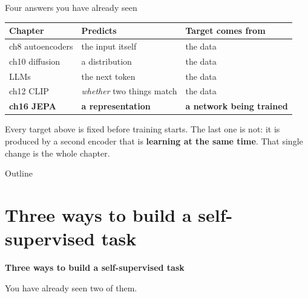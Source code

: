 \documentclass[aspectratio=169]{beamer}
\begin{document}
\begin{frame}{Four answers you have already seen}
  \small
  \begin{tabular}{@{}p{3.6cm}p{4.2cm}p{4.6cm}@{}}
    \textbf{Chapter} & \textbf{Predicts} & \textbf{Target comes from} \\[3pt]
    \hline\rule{0pt}{3ex}
    ch8 autoencoders   & the input itself      & the data \\[4pt]
    ch10 diffusion     & a distribution        & the data \\[4pt]
    LLMs               & the next token        & the data \\[4pt]
    ch12 CLIP          & \emph{whether} two things match & the data \\[6pt]
    \hline\rule{0pt}{3ex}
    \textbf{ch16 JEPA} & \textbf{a representation} & \textbf{a network being trained} \\
  \end{tabular}
  \vskip 10pt
  Every target above is fixed before training starts. The last one is not: it is produced
  by a second encoder that is \textbf{learning at the same time}.
  \vskip 6pt
  \footnotesize\color{armred}That single change is the whole chapter.
\end{frame}

\begin{frame}{Outline}
  \tableofcontents
\end{frame}

\section{Three ways to build a self-supervised task}

\begin{frame}[plain]
  \vfill
  \begin{center}
    {\Large\color{popblue}\textbf{Three ways to build a self-supervised task}}\\[0.9em]
    \begin{minipage}{0.82\textwidth}\centering\small
      You have already seen two of them.
    \end{minipage}
  \end{center}
  \vfill
\end{frame}
\end{document}
